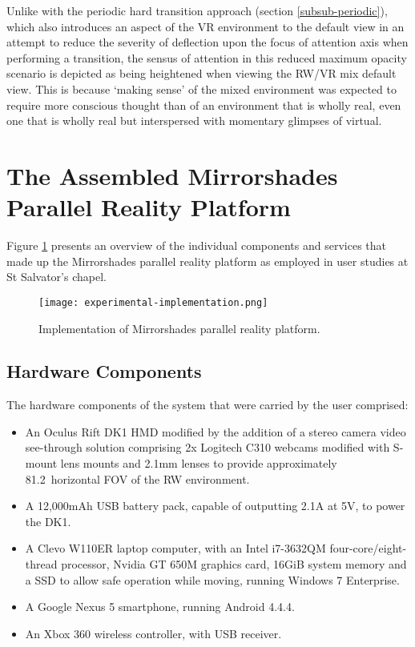 Unlike with the periodic hard transition approach (section \ref{subsub-periodic}), which also introduces an aspect of the VR environment to the default view in an attempt to reduce the severity of deflection upon the focus of attention axis when performing a transition, the sensus of attention in this reduced maximum opacity scenario is depicted as being heightened when viewing the RW/VR mix default view. This is because `making sense' of the mixed environment was expected to require more conscious thought than of an environment that is wholly real, even one that is wholly real but interspersed with momentary glimpses of virtual.


\section{The Assembled Mirrorshades Parallel Reality Platform}

Figure \ref{experimentalimplementation} presents an overview of the individual components and services that made up the Mirrorshades parallel reality platform as employed in user studies at St Salvator's chapel.

\begin{figure}[h]
	\begin{center}
		\texttt{[image: experimental-implementation.png]}
		\caption{Implementation of Mirrorshades parallel reality platform.}
		\label{experimentalimplementation}
	\end{center}
\end{figure}

\subsection{Hardware Components}
The hardware components of the system that were carried by the user comprised:
\begin{itemize}
	\item An Oculus Rift DK1 HMD modified by the addition of a stereo camera video see-through solution comprising 2x Logitech C310 webcams modified with S-mount lens mounts and 2.1mm lenses to provide approximately 81.2\textdegree\ horizontal FOV of the RW environment.
	\item A 12,000mAh USB battery pack, capable of outputting 2.1A at 5V, to power the DK1.
	\item A Clevo W110ER laptop computer, with an Intel i7-3632QM four-core/eight-thread processor, Nvidia GT 650M graphics card, 16GiB system memory and a SSD to allow safe operation while moving, running Windows 7 Enterprise.
	\item A Google Nexus 5 smartphone, running Android 4.4.4.
	\item An Xbox 360 wireless controller, with USB receiver.
\end{itemize}

